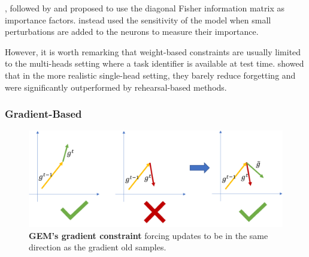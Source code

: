 \cite{kirkpatrick2017ewc}, followed by
\cite{zenke2017synaptic_intelligence} and \cite{chaudhry2018riemannien_walk}
proposed to use the diagonal Fisher information matrix as importance factors.
\cite{aljundi2018MemoryAwareSynapses} instead used the sensitivity of the model when
small perturbations are added to the neurons to measure their importance.

However, it is worth remarking that weight-based constraints are usually limited to the multi-heads
setting where a task identifier is available at test time. \cite{lesort2019regulshortcomings} showed
that in the more realistic single-head setting, they barely reduce forgetting and were significantly
outperformed by rehearsal-based methods.

\subsubsection{Gradient-Based}
\label{sec:related_regul_gradient}

\begin{figure}[tb]
      \begin{center}
            \includegraphics[width=1.0\linewidth]{images/related/gem.pdf}
      \end{center}
      \caption{\textbf{GEM's gradient constraint} forcing updates to be in the same direction as the
            gradient \wrt old samples.}
      \label{fig:related_gem}
\end{figure}


